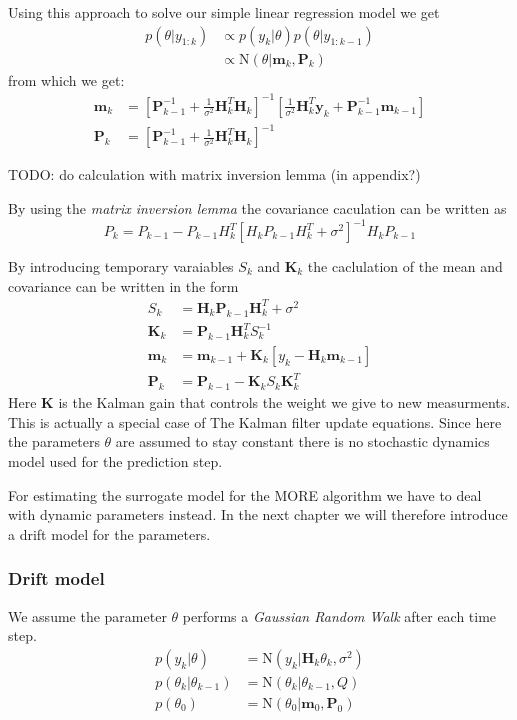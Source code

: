 Using this approach to solve our simple linear regression model we get
\begin{align}
  p(\theta | y_{1:k}) &\propto p(y_k | \theta) p(\theta | y_{1:k-1}) \\
                      &\propto \text{N}(\theta | \mathbf{m}_k, \mathbf{P}_k)
\end{align}
from which we get:
\begin{align}
  \mathbf{m}_k &= \left[ \mathbf{P}^{-1}_{k-1}
                 + \frac{1}{\sigma^2} \mathbf{H}^T_k \mathbf{H}_k \right]^{-1}
                 \left[\frac{1}{\sigma^2} \mathbf{H}^T_k \mathbf{y}_k +
                 \mathbf{P}^{-1}_{k-1} \mathbf{m}_{k-1} \right] \\
  \mathbf{P}_k &= \left[\mathbf{P}_{k-1}^{-1}
                 + \frac{1}{\sigma^2} \mathbf{H}^T_k \mathbf{H}_k \right]^{-1}
\end{align}

TODO: do calculation with matrix inversion lemma (in appendix?)

By using the \textit{matrix inversion lemma} the covariance caculation can be
written as
$$ P_k = P_{k-1} - P_{k-1} H_k^T [H_k P_{k-1} H_k^T + \sigma^2]^{-1} H_k P_{k-1} $$

By introducing temporary varaiables $S_k$ and $\mathbf{K}_k$ the caclulation of
the mean and covariance can be written in the form
\begin{align*}
     S_k &= \textbf{H}_k \textbf{P}_{k-1} \textbf{H}^T_k + \sigma^2 \\
     \textbf{K}_k &= \textbf{P}_{k-1} \textbf{H}^T_k S_k^{-1} \\
     \textbf{m}_k &= \textbf{m}_{k-1} + \textbf{K}_k [y_k - \textbf{H}_k \textbf{m}_{k-1}] \\
     \textbf{P}_k &= \textbf{P}_{k-1} - \textbf{K}_k S_k \textbf{K}_k^T
\end{align*}
Here $\mathbf{K}$ is the Kalman gain that controls the weight we give to new
measurments.
This is actually a special case of The Kalman filter update equations.
Since here the parameters $\theta$ are assumed to stay constant there is
no stochastic dynamics model used for the prediction step.

For estimating the surrogate model for the MORE algorithm we have to
deal with dynamic parameters instead. In the next chapter we will therefore
introduce a drift model for the parameters.

\subsubsection{Drift model}
We assume the parameter $\theta$ performs a \textit{Gaussian Random Walk} after
each time step.
\begin{align}
  p(y_k | \theta) &= \text{N}(y_k | \mathbf{H}_k \theta_k, \sigma^2) \\
  p(\theta_k | \theta_{k-1}) &= \text{N} (\theta_k | \theta_{k-1}, Q) \\
  p(\theta_0) &= \text{N}(\theta_0 | \mathbf{m}_0, \mathbf{P}_0)
\end{align}

